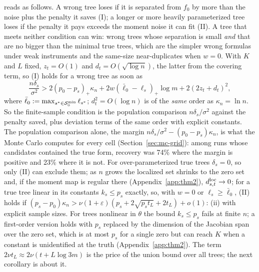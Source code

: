  reads as follows. A wrong tree loses if it is separated from $f_0$ by more than the noise plus the penalty it saves (I); a longer or more heavily parameterized tree loses if the penalty it pays exceeds the moment noise it can fit (II). A tree that meets neither condition can win: wrong trees whose separation is small \emph{and} that are no bigger than the minimal true trees, which are the simpler wrong formulas under weak instruments and the same-size near-duplicates when $w = 0$. With $K$ and $L$ fixed, $z_t = O(1)$ and $d_t = O(\sqrt{\log n})$, the latter from the covering term, so (I) holds for a wrong tree as soon as
\begin{equation}
\frac{n\delta_s}{\sigma^2} > 2(p_0 - p_s)_+\kappa_n + 2w(\bar\ell_0 - \ell_s)_+\log m + 2(2z_t + d_t)^2,
\label{eq:margin}
\end{equation}
where $\bar\ell_0 := \max_{s^* \in \mathcal{S}_0^{\min}}\ell_{s^*}$; $d_t^2 = O(\log n)$ is of the \emph{same} order as $\kappa_n = \ln n$. So the finite-sample condition is the population comparison $n\delta_s/\sigma^2$ against the penalty saved, plus deviation terms of the same order with explicit constants. The population comparison alone, the margin $n\delta_s/\sigma^2 - (p_0 - p_s)\kappa_n$, is what the Monte Carlo computes for every cell (Section~\ref{sec:mc-grid}): among runs whose candidates contained the true form, recovery was 74\% where the margin is positive and 23\% where it is not. For over-parameterized true trees $\delta_s = 0$, so only (II) can exclude them; as $n$ grows the localized set shrinks to the zero set and, if the moment map is regular there (Appendix~\ref{app:thm2}), $d^{\mathrm{loc}}_{s,t} \to 0$; for a true tree linear in its constants $k_s \le p_s$ exactly, so, with $w = 0$ or $\ell_s \ge \bar\ell_0$, (II) holds if $(p_s - p_0)\kappa_n > \nu(1 + \varepsilon)(p_s + 2\sqrt{p_st_L} + 2t_L) + o(1)$: (ii) with explicit sample sizes. For trees nonlinear in $\theta$ the bound $k_s \le p_s$ fails at finite $n$; a first-order version holds with $p_s$ replaced by the dimension of the Jacobian span over the zero set, which is at most $p_s$ for a single zero but can reach $K$ when a constant is unidentified at the truth (Appendix~\ref{app:thm2}). The term $2\nu t_L \approx 2\nu(t + L\log 3m)$ is the price of the union bound over all trees; the next corollary is about it.


